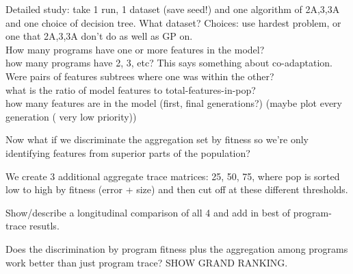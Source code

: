 Detailed study: take 1 run, 1 dataset (save seed!) and one algorithm of 2A,3,3A and one choice of decision tree.  What dataset? Choices: use hardest problem, or one that 2A,3,3A don't do as well as GP on. \\
How many programs have one or more features in the model?\\ how many programs have 2, 3, etc? This says something about co-adaptation. Were pairs of features subtrees where one was within the other?  \\what is the ratio of model features to total-features-in-pop? \\how many features are in the model (first, final generations?) (maybe plot every generation ( very low priority))

Now what if we discriminate the aggregation set by fitness so we're only identifying features from superior parts of the population?

We create 3 additional  aggregate trace matrices: 25, 50, 75,  where pop is sorted low to high by fitness (error + size) and then cut off at these different thresholds. 

Show/describe a longitudinal comparison of all 4 and add in best of program-trace resutls.

Does the discrimination by program fitness plus the aggregation among programs work better than just program trace? SHOW GRAND RANKING.


